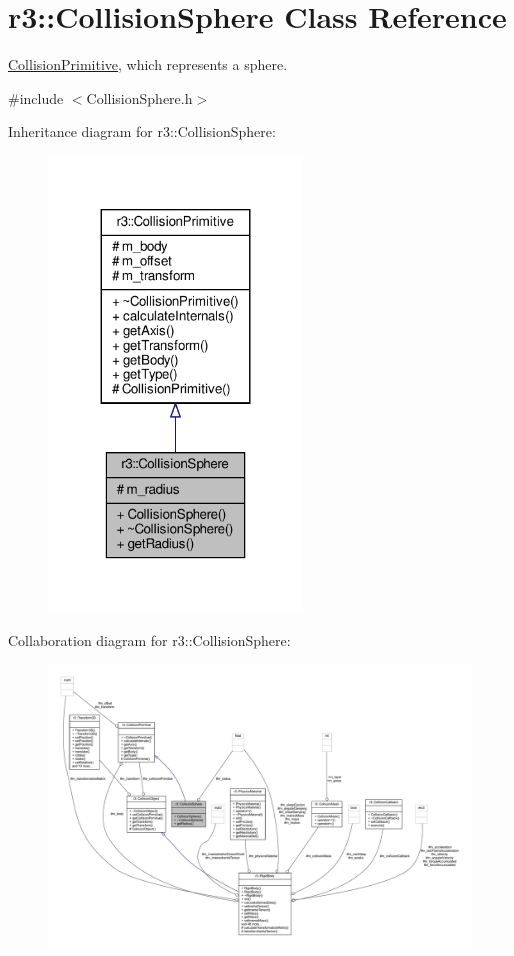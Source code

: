 \hypertarget{classr3_1_1_collision_sphere}{}\section{r3\+:\+:Collision\+Sphere Class Reference}
\label{classr3_1_1_collision_sphere}


\mbox{\hyperlink{classr3_1_1_collision_primitive}{Collision\+Primitive}}, which represents a sphere.  




{\ttfamily \#include $<$Collision\+Sphere.\+h$>$}



Inheritance diagram for r3\+:\+:Collision\+Sphere\+:\nopagebreak
\begin{figure}[H]
\begin{center}
\leavevmode
\includegraphics[width=191pt]{classr3_1_1_collision_sphere__inherit__graph}
\end{center}
\end{figure}


Collaboration diagram for r3\+:\+:Collision\+Sphere\+:\nopagebreak
\begin{figure}[H]
\begin{center}
\leavevmode
\includegraphics[width=350pt]{classr3_1_1_collision_sphere__coll__graph}
\end{center}
\end{figure}
